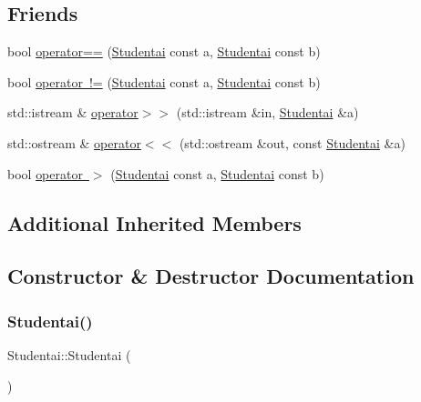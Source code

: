 \subsection*{Friends}
\begin{DoxyCompactItemize}
\item 
bool \mbox{\hyperlink{class_studentai_ac99b39ba6f9310f2348d362ed1f67fd5}{operator==}} (\mbox{\hyperlink{class_studentai}{Studentai}} const a, \mbox{\hyperlink{class_studentai}{Studentai}} const b)
\item 
bool \mbox{\hyperlink{class_studentai_adf456b2ee9385acc17327487b12982df}{operator !=}} (\mbox{\hyperlink{class_studentai}{Studentai}} const a, \mbox{\hyperlink{class_studentai}{Studentai}} const b)
\item 
std\+::istream \& \mbox{\hyperlink{class_studentai_a26a2195becea6f359ea305a80239387e}{operator$>$$>$}} (std\+::istream \&in, \mbox{\hyperlink{class_studentai}{Studentai}} \&a)
\item 
std\+::ostream \& \mbox{\hyperlink{class_studentai_a7fa0ac541336749ef2d674fd1996e8d5}{operator$<$$<$}} (std\+::ostream \&out, const \mbox{\hyperlink{class_studentai}{Studentai}} \&a)
\item 
bool \mbox{\hyperlink{class_studentai_a3cc21bd1970b311949cd76aa93c5cf4f}{operator $>$}} (\mbox{\hyperlink{class_studentai}{Studentai}} const a, \mbox{\hyperlink{class_studentai}{Studentai}} const b)
\end{DoxyCompactItemize}
\subsection*{Additional Inherited Members}


\subsection{Constructor \& Destructor Documentation}
\mbox{\label{class_studentai_a8f53d55bca475d5bf1973f4f3c53f047}} 
\subsubsection{\texorpdfstring{Studentai()}{Studentai()}\hspace{0.1cm}{\footnotesize\ttfamily [1/2]}}
{\footnotesize\ttfamily Studentai\+::\+Studentai (\begin{DoxyParamCaption}{ }\end{DoxyParamCaption})\hspace{0.3cm}{\ttfamily [inline]}}

